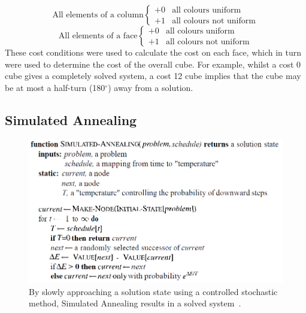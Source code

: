 \documentclass[UKenglish]{libraries/svproc}
\begin{document}
\[
   \text{All elements of a column} 
    \begin{cases} 
      +0 & \text{all colours uniform} \\
      +1 & \text{all colours not uniform}
   \end{cases}
\]
\[
   \text{All elements of a face} 
    \begin{cases} 
      +0 & \text{all colours uniform} \\
      +1 & \text{all colours not uniform}
   \end{cases}
\]
These cost conditions were used to calculate the cost on each face, which in turn were used to determine the cost of the overall cube. For example, whilst a cost 0 cube gives a completely solved system, a cost 12 cube implies that the cube may be at most a half-turn (180$^{\circ}$) away from a solution. 

\subsection{Simulated Annealing}

\begin{figure}[!h]
\begin{small}
\centering
\linespread{1.0}
\includegraphics[width=0.75\linewidth]{images/simulated annealing}
\caption{By slowly approaching a solution state using a controlled stochastic method, Simulated Annealing results in a solved system~\cite{10.5555/1671238}.}
\label{fig:fig1}
\end{small}
\end{figure}
\end{document}
